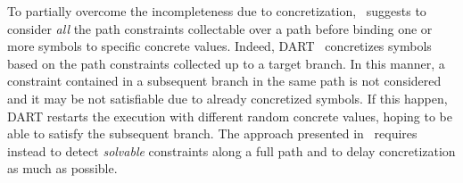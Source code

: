 To partially overcome the incompleteness due to concretization,~\cite{PRV-ISSTA11} suggests to consider {\em all} the path constraints collectable over a path before binding one or more symbols to specific concrete values. Indeed, {\sc DART}~\cite{DART-PLDI05} concretizes symbols based on the path constraints collected up to a target branch. In this manner, a constraint contained in a subsequent branch in the same path is not considered and it may be not satisfiable due to already concretized symbols. If this happen, {\sc DART} restarts the execution with different random concrete values, hoping to be able to satisfy the subsequent branch. The approach presented in~\cite{PRV-ISSTA11} requires instead to detect {\em solvable} constraints along a full path and to delay concretization as much as possible.


